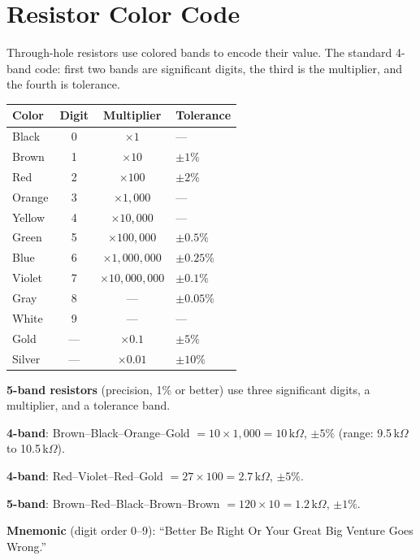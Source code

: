 \documentclass[11pt,letterpaper,twoside,openany]{book}
\begin{document}
\section{Resistor Color Code}

Through-hole resistors use colored bands to encode their value. The standard 4-band code: first two bands are significant digits, the third is the multiplier, and the fourth is tolerance.

\begin{center}
\begin{tabular}{lccl}
\toprule
\textbf{Color} & \textbf{Digit} & \textbf{Multiplier} & \textbf{Tolerance} \\
\midrule
Black   & 0 & $\times 1$         & --- \\
Brown   & 1 & $\times 10$        & $\pm 1\%$ \\
Red     & 2 & $\times 100$       & $\pm 2\%$ \\
Orange  & 3 & $\times 1{,}000$   & --- \\
Yellow  & 4 & $\times 10{,}000$  & --- \\
Green   & 5 & $\times 100{,}000$ & $\pm 0.5\%$ \\
Blue    & 6 & $\times 1{,}000{,}000$ & $\pm 0.25\%$ \\
Violet  & 7 & $\times 10{,}000{,}000$ & $\pm 0.1\%$ \\
Gray    & 8 & ---                & $\pm 0.05\%$ \\
White   & 9 & ---                & --- \\
Gold    & --- & $\times 0.1$     & $\pm 5\%$ \\
Silver  & --- & $\times 0.01$    & $\pm 10\%$ \\
\bottomrule
\end{tabular}
\end{center}

\textbf{5-band resistors} (precision, 1\% or better) use three significant digits, a multiplier, and a tolerance band.

\begin{tipbox}
\textbf{4-band}: Brown--Black--Orange--Gold $= 10 \times 1{,}000 = 10\,\text{k}\Omega$, $\pm 5\%$ (range: 9.5\,k$\Omega$ to 10.5\,k$\Omega$).

\textbf{4-band}: Red--Violet--Red--Gold $= 27 \times 100 = 2.7\,\text{k}\Omega$, $\pm 5\%$.

\textbf{5-band}: Brown--Red--Black--Brown--Brown $= 120 \times 10 = 1.2\,\text{k}\Omega$, $\pm 1\%$.

\textbf{Mnemonic} (digit order 0--9): ``Better Be Right Or Your Great Big Venture Goes Wrong.''
\end{tipbox}
\end{document}
